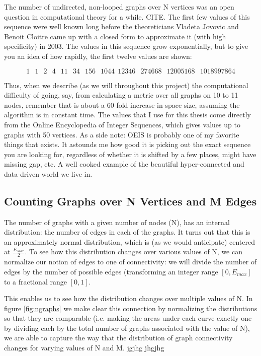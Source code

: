The number of undirected, non-looped graphs over N vertices was an open question in computational theory for a while. CITE.
The first few values of this sequence were well known long before the theoreticians Vladeta Jovovic and Benoit Cloitre came up with a closed form to approximate it (with high specificity) in 2003.
The values in this sequence grow exponentially, but to give you an idea of how rapidly, the first twelve values are shown:

$$1\,\; \;1\, \;\;2\, \;\;4\, \;\;11\, \;\;34\, \;\;156\, \;\;1044\,\; 12346\,\;\; 274668\, \;\;12005168\, \;\;1018997864$$

Thus, when we describe (as we will throughout this project) the computational difficulty of going, say, from calculating a metric over all graphs on 10 to 11 nodes, remember that is about a 60-fold increase in space size, assuming the algorithm is in constant time.
The values that I use for this thesis come directly from the Online Encyclopedia of Integer Sequences, which gives values up to graphs with 50 vertices.
As a side note: OEIS is probably one of my favorite things that exists.
It astounds me how good it is picking out the exact sequence you are looking for, regardless of whether it is shifted by a few places, might have missing gap, etc.
A well cooked example of the beautiful hyper-connected and data-driven world we live in.

\subsection{Counting Graphs over N Vertices and M Edges}

The number of graphs with a given number of nodes (N), has an internal distribution: the number of edges in each of the graphs.
It turns out that this is an approximately normal distribution, which is (as we would anticipate) centered at $\frac{E_{Max}}{2}$. 
To see how this distribution changes over various values of N, we can normalize our notion of edges to one of connectivity:
we will divide the number of edges by the number of possible edges (transforming an integer range $[0, E_{max}]$ to a fractional range $[0, 1]$.

This enables us to see how the distribution changes over multiple values of N.
In figure \ref{fig:ngraphs} we make clear this connection by normalizing the distributions so that they are comparable (i.e. making the areas under each curve exactly one by dividing each by the total number of graphs associated with the value of N), we are able to capture the way that the distribution of graph connectivity changes for varying values of N and M. jgjhg jhgjhg 

